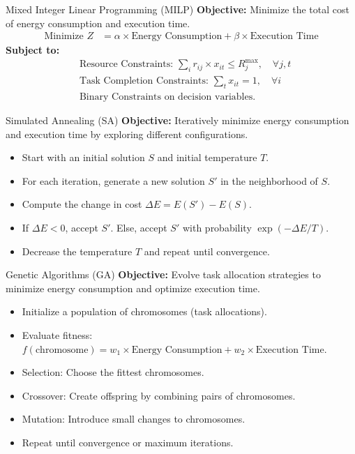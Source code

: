 \documentclass{beamer}
\begin{document}
\begin{frame}{Mixed Integer Linear Programming (MILP)}
    \textbf{Objective:} Minimize the total cost of energy consumption and execution time.
    \begin{align*}
        \text{Minimize } Z &= \alpha \times \text{Energy Consumption} + \beta \times \text{Execution Time}
    \end{align*}
    \textbf{Subject to:}
    \begin{align*}
        &\text{Resource Constraints: } \sum_{i} r_{ij} \times x_{it} \leq R_{j}^{\text{max}}, \quad \forall j, t \\
        &\text{Task Completion Constraints: } \sum_{t} x_{it} = 1, \quad \forall i \\
        &\text{Binary Constraints on decision variables.}
    \end{align*}
\end{frame}

\begin{frame}{Simulated Annealing (SA)}
    \textbf{Objective:} Iteratively minimize energy consumption and execution time by exploring different configurations.
    \begin{itemize}
        \item Start with an initial solution \(S\) and initial temperature \(T\).
        \item For each iteration, generate a new solution \(S'\) in the neighborhood of \(S\).
        \item Compute the change in cost \(\Delta E = E(S') - E(S)\).
        \item If \(\Delta E < 0\), accept \(S'\). Else, accept \(S'\) with probability \(\exp(-\Delta E / T)\).
        \item Decrease the temperature \(T\) and repeat until convergence.
    \end{itemize}
\end{frame}

\begin{frame}{Genetic Algorithms (GA)}
    \textbf{Objective:} Evolve task allocation strategies to minimize energy consumption and optimize execution time.
    \begin{itemize}
        \item Initialize a population of chromosomes (task allocations).
        \item Evaluate fitness: \(f(\text{chromosome}) = w_1 \times \text{Energy Consumption} + w_2 \times \text{Execution Time}\).
        \item Selection: Choose the fittest chromosomes.
        \item Crossover: Create offspring by combining pairs of chromosomes.
        \item Mutation: Introduce small changes to chromosomes.
        \item Repeat until convergence or maximum iterations.
    \end{itemize}
\end{frame}
\end{document}
